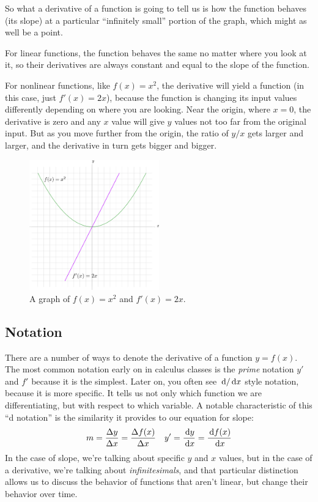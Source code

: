 So what a derivative of a function is going to tell us is how the function behaves (its slope) at a particular ``infinitely small'' portion of the graph, which might as well be a point.

For linear functions, the function behaves the same no matter where you look at it, so their derivatives are always constant and equal to the slope of the function.

For nonlinear functions, like $f(x)=x^2$, the derivative will yield a function (in this case, just $f'(x)=2x$), because the function is changing its input values differently depending on where you are looking. Near the origin, where $x=0$, the derivative is zero and any $x$ value will give $y$ values not too far from the original input. But as you move further from the origin, the ratio of $y/x$ gets larger and larger, and the derivative in turn gets bigger and bigger.

\begin{figure}[H]
    \begin{center}
      \includegraphics[width=0.5\textwidth]{continuous/derivatives/xsquared.eps}
      \caption{A graph of $f(x)=x^2$ and $f'(x)=2x$.}
    \end{center}
  \end{figure}

\subsection{Notation}

There are a number of ways to denote the derivative of a function $y=f(x)$. The most common notation early on in calculus classes is the \emph{prime} notation $y'$ and $f'$ because it is the simplest. Later on, you often see $\,\mathrm{d}/\,\mathrm{d} x$ style notation, because it is more specific. It tells us not only which function we are differentiating, but with respect to which variable. A notable characteristic of this ``d notation'' is the similarity it provides to our equation for slope:
\begin{align*}
  &m=\frac{\Delta y}{\Delta x}=\frac{\Delta f(x)}{\Delta x} &y'=\frac{\,\mathrm{d} y}{\,\mathrm{d} x}=\frac{\,\mathrm{d} f(x)}{\,\mathrm{d} x}
\end{align*}
In the case of slope, we're talking about specific $y$ and $x$ values, but in the case of a derivative, we're talking about \emph{infinitesimals}, and that particular distinction allows us to discuss the behavior of functions that aren't linear, but change their behavior over time.

